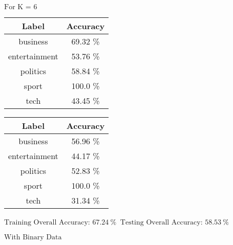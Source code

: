 \documentclass[8pt]{extarticle}
\begin{document}
    $\displaystyle \text{For K = }6$
    \begin{center}
        \quad
    \end{center}
    \begin{center}
        \begin{tabular}{cc}
            \hline
            Label & Accuracy\\
            \hline
            business &   69.32 \% \\
       entertainment &   53.76 \% \\
           politics  &   58.84 \% \\
              sport  &   100.0 \% \\
               tech  &   43.45 \%
         \end{tabular}
         \quad
        \begin{tabular}{cc}
            \hline
            Label & Accuracy\\
            \hline
            business &   56.96 \% \\
        entertainment &  44.17 \% \\
           politics  &   52.83 \% \\
              sport  &   100.0  \% \\
               tech  &   31.34 \%
        \end{tabular}
    \end{center}
    \begin{center}
        $\displaystyle \text{Training Overall Accuracy:\ }67.24\ \%$
        $\displaystyle \ \text{Testing Overall Accuracy:\ }58.53\ \%$
    \end{center}

    \newpage
    \begin{center}
        $\displaystyle \text{With }\text{Binary}\text{ Data}$
    \end{center}
\end{document}
